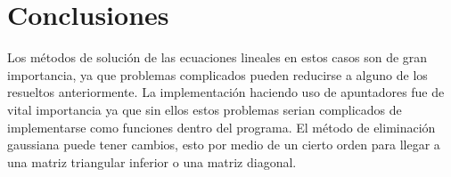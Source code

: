\section{Conclusiones}

Los métodos de solución de las ecuaciones lineales en estos casos son de gran importancia, ya que problemas complicados pueden reducirse a alguno de los resueltos anteriormente. La implementación haciendo uso de apuntadores fue de vital importancia ya que sin ellos estos problemas serian complicados de implementarse como funciones dentro del programa. El método de eliminación gaussiana puede tener cambios, esto por medio de un cierto orden para llegar a una matriz triangular inferior o una matriz diagonal.